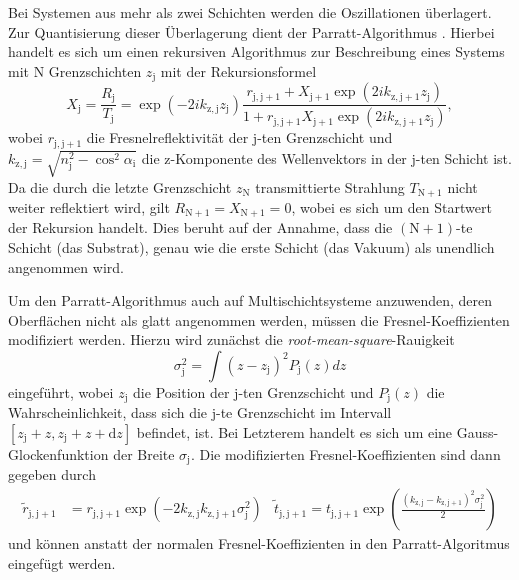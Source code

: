 Bei Systemen aus mehr als zwei Schichten werden die Oszillationen überlagert. Zur Quantisierung dieser Überlagerung dient der Parratt-Algorithmus \cite{parratt}. Hierbei handelt es sich um einen rekursiven Algorithmus zur Beschreibung eines Systems mit N Grenzschichten $z_\mathrm{j}$ mit der Rekursionsformel
\begin{equation*}
  X_\mathrm{j} = \frac{R_\mathrm{j}}{T_\mathrm{j}} = \exp \left( -2 i k_\mathrm{z,j} z_\mathrm{j} \right) \frac{ r_{\mathrm{j,j}+1} + X_{\mathrm{j}+1} \exp \left( 2i k_{\mathrm{z,j}+1} z_\mathrm{j} \right) }{ 1 + r_{\mathrm{j,j}+1} X_{\mathrm{j}+1} \exp \left( 2i k_{\mathrm{z,j}+1} z_\mathrm{j} \right) },
\end{equation*}
wobei $r_{\mathrm{j,j}+1}$ die Fresnelreflektivität der j-ten Grenzschicht und $k_{\mathrm{z,j}} = \sqrt{n_\mathrm{j}^2 - \cos^2 \alpha_\mathrm{i}} $ die z-Komponente des Wellenvektors in der j-ten Schicht ist.
Da die durch die letzte Grenzschicht $z_\mathrm{N}$ transmittierte Strahlung $T_{\mathrm{N}+1}$ nicht weiter reflektiert wird, gilt $R_{\mathrm{N}+1} = X_{\mathrm{N}+1} = 0$, wobei es sich um den Startwert der Rekursion handelt. Dies beruht auf der Annahme, dass die $(\mathrm{N}+1)$-te Schicht (das Substrat), genau wie die erste Schicht (das Vakuum) als unendlich angenommen wird.

Um den Parratt-Algorithmus auch auf Multischichtsysteme anzuwenden, deren Oberflächen nicht als glatt angenommen werden, müssen die Fresnel-Koeffizienten modifiziert werden. Hierzu wird zunächst die \textit{root-mean-square}-Rauigkeit
\begin{equation*}
  \sigma_\mathrm{j}^2 = \int \left( z - z_\mathrm{j} \right)^2 P_\mathrm{j} (z) dz
\end{equation*}
eingeführt, wobei $z_\mathrm{j}$ die Position der j-ten Grenzschicht und $P_\mathrm{j} (z)$ die Wahrscheinlichkeit, dass sich die j-te Grenzschicht im Intervall $[z_\mathrm{j} + z, z_\mathrm{j} + z + \mathrm{d}z]$ befindet, ist. Bei Letzterem handelt es sich um eine Gauss-Glockenfunktion der Breite $\sigma_\mathrm{j}$. Die modifizierten Fresnel-Koeffizienten sind dann gegeben durch
\begin{align*}
  \tilde{r}_{\mathrm{j,j}+1} &= r_{\mathrm{j,j}+1} \exp \left( -2 k_\mathrm{z,j} k_{\mathrm{z,j}+1} \sigma_\mathrm{j}^2 \right) &
  \tilde{t}_{\mathrm{j,j}+1} = t_{\mathrm{j,j}+1} \exp \left( \frac{ \left( k_\mathrm{z,j} - k_{\mathrm{z,j}+1} \right)^2 \sigma_\mathrm{j}^2 }{2} \right)
\end{align*}
und können anstatt der normalen Fresnel-Koeffizienten in den Parratt-Algoritmus eingefügt werden.

